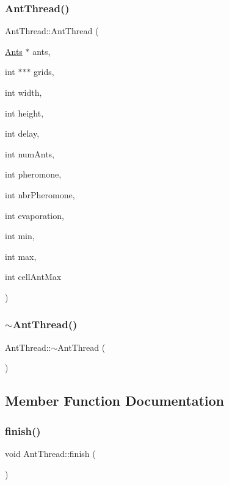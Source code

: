 \subsubsection{\texorpdfstring{Ant\+Thread()}{AntThread()}}
{\footnotesize\ttfamily Ant\+Thread\+::\+Ant\+Thread (\begin{DoxyParamCaption}\item[{\hyperlink{ant_8h_aec6851c40fb4deaad9f1fdb5b1c5ec28}{Ants} $\ast$}]{ants,  }\item[{int $\ast$$\ast$$\ast$}]{grids,  }\item[{int}]{width,  }\item[{int}]{height,  }\item[{int}]{delay,  }\item[{int}]{num\+Ants,  }\item[{int}]{pheromone,  }\item[{int}]{nbr\+Pheromone,  }\item[{int}]{evaporation,  }\item[{int}]{min,  }\item[{int}]{max,  }\item[{int}]{cell\+Ant\+Max }\end{DoxyParamCaption})}

\mbox{\label{classAntThread_aaab743ddebd58fab4cc0c5b8f4851f15}} 
\subsubsection{\texorpdfstring{$\sim$\+Ant\+Thread()}{~AntThread()}}
{\footnotesize\ttfamily Ant\+Thread\+::$\sim$\+Ant\+Thread (\begin{DoxyParamCaption}{ }\end{DoxyParamCaption})}



\subsection{Member Function Documentation}
\mbox{\label{classAntThread_a13b02a6b99441aa2191161337fa1f138}} 
\subsubsection{\texorpdfstring{finish()}{finish()}}
{\footnotesize\ttfamily void Ant\+Thread\+::finish (\begin{DoxyParamCaption}{ }\end{DoxyParamCaption})\hspace{0.3cm}{\ttfamily [inline]}}

